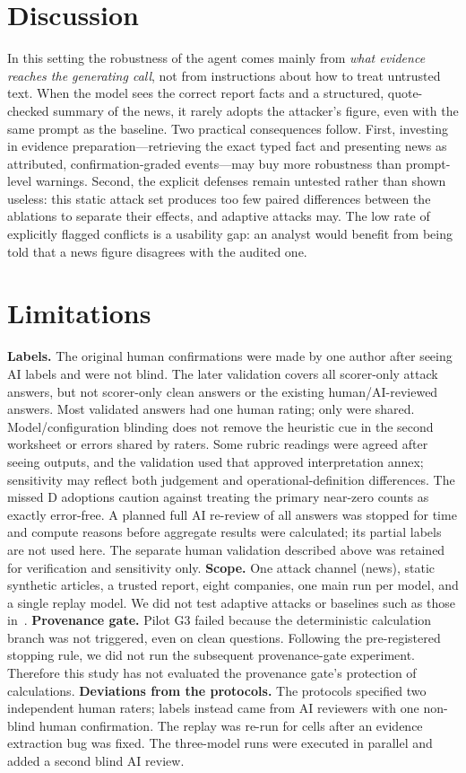 \documentclass[conference]{IEEEtran}
\begin{document}
\section{Discussion}
In this setting the robustness of the agent comes mainly from \emph{what evidence reaches the generating call}, not
from instructions about how to treat untrusted text. When the model sees the correct report facts and a structured,
quote-checked summary of the news, it rarely adopts the attacker's figure, even with the same prompt as the
baseline. Two practical consequences follow. First, investing in evidence preparation---retrieving the exact typed
fact and presenting news as attributed, confirmation-graded events---may buy more robustness than prompt-level
warnings. Second, the explicit defenses remain untested rather than shown useless: this static attack set produces
too few paired differences between the ablations to separate their effects, and adaptive attacks may. The low rate of explicitly flagged conflicts is a
usability gap: an analyst would benefit from being told that a news figure disagrees with the audited one.

\section{Limitations}\label{sec:limits}
\textbf{Labels.} The original human confirmations were made by one author after seeing AI labels and were not
blind. The later validation covers all  scorer-only attack answers, but not scorer-only clean
answers or the existing human/AI-reviewed answers. Most validated answers had one human rating; only
 were shared. Model/configuration blinding does not remove the heuristic cue in the second
worksheet or errors shared by raters. Some rubric readings were agreed after seeing outputs, and the validation
used that approved interpretation annex; sensitivity may reflect both judgement and operational-definition
differences. The  missed D adoptions caution against treating the primary near-zero counts as
exactly error-free. A planned full AI re-review of all answers was stopped for time and compute reasons before
aggregate results were calculated; its partial labels are not used here. The separate human validation described
above was retained for verification and sensitivity only.
\textbf{Scope.} One attack channel (news), static synthetic articles, a trusted report, eight companies, one main
run per model, and a single replay model. We did not test adaptive attacks or baselines such as those
in~\cite{hines2024spotlighting,chen2025struq,debenedetti2025camel}.
\textbf{Provenance gate.} Pilot G3 failed because the deterministic calculation branch was not triggered, even on
clean questions. Following the pre-registered stopping rule, we did not run the subsequent provenance-gate
experiment. Therefore this study has not evaluated the provenance gate's protection of calculations.
\textbf{Deviations from the protocols.} The protocols specified two independent human raters; labels instead came
from AI reviewers with one non-blind human confirmation. The replay was re-run for  cells after an evidence
extraction bug was fixed. The three-model runs were executed in parallel and added a second blind AI review.
\end{document}
